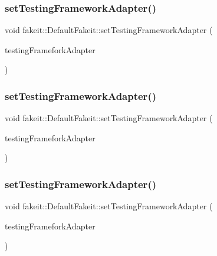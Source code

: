 \subsubsection{\texorpdfstring{setTestingFrameworkAdapter()}{setTestingFrameworkAdapter()}\hspace{0.1cm}{\footnotesize\ttfamily [3/9]}}
{\footnotesize\ttfamily void fakeit\+::\+Default\+Fakeit\+::set\+Testing\+Framework\+Adapter (\begin{DoxyParamCaption}\item[{\mbox{\hyperlink{structfakeit_1_1EventHandler}{fakeit\+::\+Event\+Handler}} \&}]{testing\+Framefork\+Adapter }\end{DoxyParamCaption})\hspace{0.3cm}{\ttfamily [inline]}}

\mbox{\label{classfakeit_1_1DefaultFakeit_a7e5375cb58acb0e27a374a32ecf37b5a}} 
\subsubsection{\texorpdfstring{setTestingFrameworkAdapter()}{setTestingFrameworkAdapter()}\hspace{0.1cm}{\footnotesize\ttfamily [4/9]}}
{\footnotesize\ttfamily void fakeit\+::\+Default\+Fakeit\+::set\+Testing\+Framework\+Adapter (\begin{DoxyParamCaption}\item[{\mbox{\hyperlink{structfakeit_1_1EventHandler}{fakeit\+::\+Event\+Handler}} \&}]{testing\+Framefork\+Adapter }\end{DoxyParamCaption})\hspace{0.3cm}{\ttfamily [inline]}}

\mbox{\label{classfakeit_1_1DefaultFakeit_a7e5375cb58acb0e27a374a32ecf37b5a}} 
\subsubsection{\texorpdfstring{setTestingFrameworkAdapter()}{setTestingFrameworkAdapter()}\hspace{0.1cm}{\footnotesize\ttfamily [5/9]}}
{\footnotesize\ttfamily void fakeit\+::\+Default\+Fakeit\+::set\+Testing\+Framework\+Adapter (\begin{DoxyParamCaption}\item[{\mbox{\hyperlink{structfakeit_1_1EventHandler}{fakeit\+::\+Event\+Handler}} \&}]{testing\+Framefork\+Adapter }\end{DoxyParamCaption})\hspace{0.3cm}{\ttfamily [inline]}}

